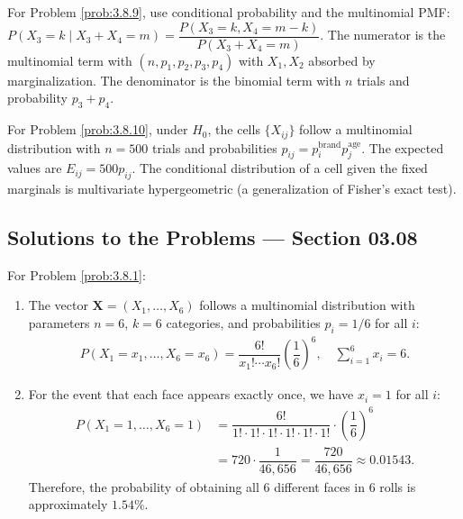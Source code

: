 \begin{sugerencia}
	\label{sug:3.8.9}
	For Problem \ref{prob:3.8.9}, use conditional probability and the multinomial PMF: $P(X_{3} = k \mid X_{3} + X_{4} = m) = \dfrac{P(X_{3} = k, X_{4} = m-k)}{P(X_{3} + X_{4} = m)}$. The numerator is the multinomial term with $(n, p_{1}, p_{2}, p_{3}, p_{4})$ with $X_{1}, X_{2}$ absorbed by marginalization. The denominator is the binomial term with $n$ trials and probability $p_{3} + p_{4}$.
\end{sugerencia}

\begin{sugerencia}
	\label{sug:3.8.10}
	For Problem \ref{prob:3.8.10}, under $H_{0}$, the cells $\{X_{ij}\}$ follow a multinomial distribution with $n = 500$ trials and probabilities $p_{ij} = p_{i}^{\text{brand}} p_{j}^{\text{age}}$. The expected values are $E_{ij} = 500 p_{ij}$. The conditional distribution of a cell given the fixed marginals is multivariate hypergeometric (a generalization of Fisher's exact test).
\end{sugerencia}

\subsection*{Solutions to the Problems --- Section 03.08}

\begin{solucion}
	\label{sol:3.8.1}
	For Problem \ref{prob:3.8.1}:
	\begin{enumerate}
		\item The vector $\bm{X} = (X_{1}, \dots, X_{6})$ follows a multinomial distribution with parameters $n = 6$, $k = 6$ categories, and probabilities $p_{i} = 1/6$ for all $i$:
		\begin{align*}
			P(X_{1} = x_{1}, \dots, X_{6} = x_{6}) = \dfrac{6!}{x_{1}! \cdots x_{6}!} \left(\dfrac{1}{6}\right)^{6}, \quad \sum_{i=1}^{6} x_{i} = 6.
		\end{align*}
		\item For the event that each face appears exactly once, we have $x_{i} = 1$ for all $i$:
		\begin{align*}
			P(X_{1} = 1, \dots, X_{6} = 1) &= \dfrac{6!}{1! \cdot 1! \cdot 1! \cdot 1! \cdot 1! \cdot 1!} \cdot \left(\dfrac{1}{6}\right)^{6} \\
			&= 720 \cdot \dfrac{1}{46{,}656} = \dfrac{720}{46{,}656} \approx 0.01543.
		\end{align*}
		Therefore, the probability of obtaining all 6 different faces in 6 rolls is approximately $1.54\%$.
	\end{enumerate}
\end{solucion}

